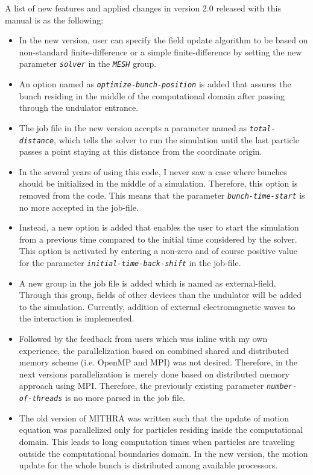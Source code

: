 A list of new features and applied changes in version 2.0 released with this manual is as the following:
%
\begin{itemize}
	\setlength{\parskip}{0pt}
	\setlength{\itemsep}{0pt plus 1pt}
	\item In the new version, user can specify the field update algorithm to be based on non-standard finite-difference or a simple finite-difference by setting the new parameter {\tt \small \em solver} in the {\tt \small \em MESH} group.
	\item An option named as {\tt \small \em optimize-bunch-position} is added that assures the bunch residing in the middle of the computational domain after passing through the undulator entrance.
	\item The job file in the new version accepts a parameter named as {\tt \small \em total-distance}, which tells the solver to run the simulation until the last particle passes a point staying at this distance from the coordinate origin.
	\item In the several years of using this code, I never saw a case where bunches should be initialized in the middle of a simulation. Therefore, this option is removed from the code. This means that the parameter {\tt \small \em bunch-time-start} is no more accepted in the job-file.
	\item Instead, a new option is added that enables the user to start the simulation from a previous time compared to the initial time considered by the solver. This option is activated by entering a non-zero and of course positive value for the parameter {\tt \small \em initial-time-back-shift} in the job-file.
	\item A new group in the job file is added which is named as external-field. Through this group, fields of other devices than the undulator will be added to the simulation. Currently, addition of external electromagnetic waves to the interaction is implemented.
	\item Followed by the feedback from users which was inline with my own experience, the parallelization based on combined shared and distributed memory scheme (i.e. OpenMP and MPI) was not desired. Therefore, in the next versions parallelization is merely done based on distributed memory approach using MPI. Therefore, the previously existing parameter {\tt \em \small number-of-threads} is no more parsed in the job file.
	\item The old version of MITHRA was written such that the update of motion equation was parallelized only for particles residing inside the computational domain. This leads to long computation times when particles are traveling outside the computational boundaries domain. In the new version, the motion update for the whole bunch is distributed among available processors.

\end{itemize}
